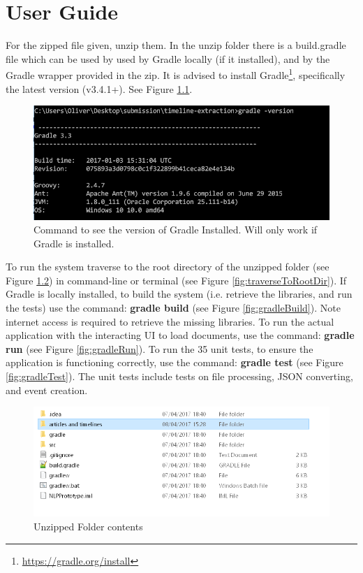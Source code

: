 \chapter{User Guide}
\par For the zipped file given, unzip them. In the unzip folder there is a build.gradle file which can be used by used by Gradle locally (if it installed), and by the Gradle wrapper provided in the zip. It is advised to install Gradle\footnote{\url{https://gradle.org/install}}, specifically the latest version (v3.4.1+). See Figure \ref{fig:gradleVersion}.

\begin{figure}[H]
\caption{Command to see the version of Gradle Installed. Will only work if Gradle is installed.}
\label{fig:gradleVersion}
\includegraphics{gradleVersion.PNG}
\centering
\end{figure}


\par To run the system traverse to the root directory of the unzipped folder (see Figure \ref{fig:folderDirectory}) in command-line or terminal (see Figure \ref{fig:traverseToRootDir}). If Gradle is locally installed, to build the system (i.e. retrieve the libraries, and run the tests) use the command: \textbf{gradle build} (see Figure \ref{fig:gradleBuild}). Note internet access is required to retrieve the missing libraries. To run the actual application with the interacting UI to load documents, use the command: \textbf{gradle run} (see Figure \ref{fig:gradleRun}). To run the 35 unit tests, to ensure the application is functioning correctly, use the command: \textbf{gradle test} (see Figure \ref{fig:gradleTest}). The unit tests include tests on file processing, JSON converting, and event creation.

\begin{figure}[H]
\caption{Unzipped Folder contents}
\label{fig:folderDirectory}
\includegraphics{folderDirectory.PNG}
\centering
\end{figure}

